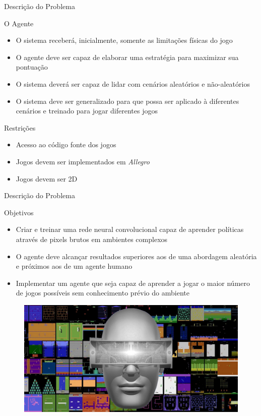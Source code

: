\documentclass[aspectratio=169]{beamer}
\begin{document}
\begin{frame}{Descrição do Problema}
	\begin{block}{\large{{O Agente}}}
		\begin{itemize}
			\item O sistema receberá, inicialmente, somente as limitações físicas do jogo
			\item O agente deve ser capaz de elaborar uma estratégia para maximizar sua pontuação
			\item O sistema deverá ser capaz de lidar com cenários aleatórios e não-aleatórios
			\item O sistema deve ser generalizado para que possa ser aplicado à diferentes cenários e treinado para jogar diferentes jogos
		\end{itemize}
	\end{block}
	\pause
	\begin{block}{\large{{Restrições}}}
		\begin{itemize}
			\item Acesso ao código fonte dos jogos
			\item Jogos devem ser implementados em \textit{Allegro}
			\item Jogos devem ser 2D
		\end{itemize}
	\end{block}

\end{frame}

\begin{frame}{Descrição do Problema}
	
	\begin{block}{\large{{Objetivos}}}
		\begin{itemize}
			\item Criar e treinar uma rede neural convolucional capaz de aprender políticas através de pixels brutos em ambientes complexos

			\item O agente deve alcançar resultados superiores aos de uma abordagem aleatória e próximos aos de um agente humano

			\item Implementar um agente que seja capaz de aprender a jogar o maior número de jogos possíveis sem conhecimento prévio do ambiente
		\end{itemize}
	\end{block}
	\begin{figure}
	\centering
	\includegraphics[width=.35 \textwidth]{imgs/Atari57-Games-With-AI.jpg}
	\end{figure}
\end{frame}
\end{document}
